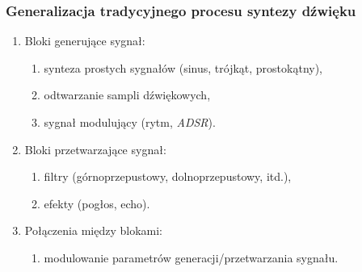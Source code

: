 \documentclass[]{beamer}
\begin{document}
\begin{frame}
  \frametitle{Generalizacja tradycyjnego procesu syntezy dźwięku}

  \begin{enumerate}
    \item Bloki generujące sygnał:
      \begin{enumerate}
        \item synteza prostych sygnałów (sinus, trójkąt, prostokątny),
        \item odtwarzanie sampli dźwiękowych,
        \item sygnał modulujący (rytm, \textit{ADSR}).
      \end{enumerate}
    \item Bloki przetwarzające sygnał:
      \begin{enumerate}
        \item filtry (górnoprzepustowy, dolnoprzepustowy, itd.),
        \item efekty (pogłos, echo).
      \end{enumerate}
    \item Połączenia między blokami:
      \begin{enumerate}
        \item modulowanie parametrów generacji/przetwarzania sygnału.
      \end{enumerate}
  \end{enumerate}
\end{frame}
\end{document}
